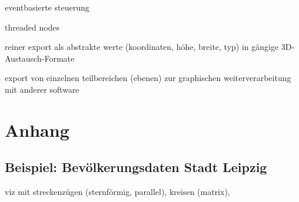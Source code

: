 \documentclass[a4paper, 12pt, DIVcalc, onepage, pdftex, headsepline, footsepline]{scrreprt}
\begin{document}
eventbasierte steuerung

threaded nodes

reiner export als abstrakte werte (koordinaten, höhe, breite, typ) in gängige 3D-Austausch-Formate

export von einzelnen teilbereichen (ebenen) zur graphischen weiterverarbeitung mit anderer software



\listoftables
\listoffigures
\chapter{Anhang}
\section{Beispiel: Bevölkerungsdaten Stadt Leipzig}
viz mit streckenzügen (sternförmig, parallel), kreisen (matrix),
\end{document}
